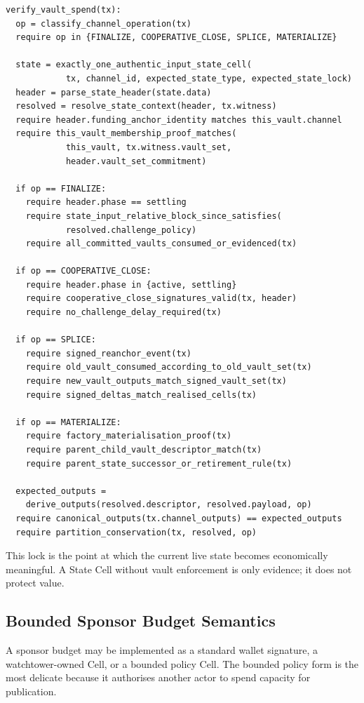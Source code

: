 \documentclass[a4paper,11pt]{article}
\begin{document}
\begin{lstlisting}
verify_vault_spend(tx):
  op = classify_channel_operation(tx)
  require op in {FINALIZE, COOPERATIVE_CLOSE, SPLICE, MATERIALIZE}

  state = exactly_one_authentic_input_state_cell(
            tx, channel_id, expected_state_type, expected_state_lock)
  header = parse_state_header(state.data)
  resolved = resolve_state_context(header, tx.witness)
  require header.funding_anchor_identity matches this_vault.channel
  require this_vault_membership_proof_matches(
            this_vault, tx.witness.vault_set,
            header.vault_set_commitment)

  if op == FINALIZE:
    require header.phase == settling
    require state_input_relative_block_since_satisfies(
            resolved.challenge_policy)
    require all_committed_vaults_consumed_or_evidenced(tx)

  if op == COOPERATIVE_CLOSE:
    require header.phase in {active, settling}
    require cooperative_close_signatures_valid(tx, header)
    require no_challenge_delay_required(tx)

  if op == SPLICE:
    require signed_reanchor_event(tx)
    require old_vault_consumed_according_to_old_vault_set(tx)
    require new_vault_outputs_match_signed_vault_set(tx)
    require signed_deltas_match_realised_cells(tx)

  if op == MATERIALIZE:
    require factory_materialisation_proof(tx)
    require parent_child_vault_descriptor_match(tx)
    require parent_state_successor_or_retirement_rule(tx)

  expected_outputs =
    derive_outputs(resolved.descriptor, resolved.payload, op)
  require canonical_outputs(tx.channel_outputs) == expected_outputs
  require partition_conservation(tx, resolved, op)
\end{lstlisting}

This lock is the point at which the current live state becomes economically meaningful. A State Cell without vault enforcement is only evidence; it does not protect value.

\subsection{Bounded Sponsor Budget Semantics}

A sponsor budget may be implemented as a standard wallet signature, a watchtower-owned Cell, or a bounded policy Cell. The bounded policy form is the most delicate because it authorises another actor to spend capacity for publication.
\end{document}
